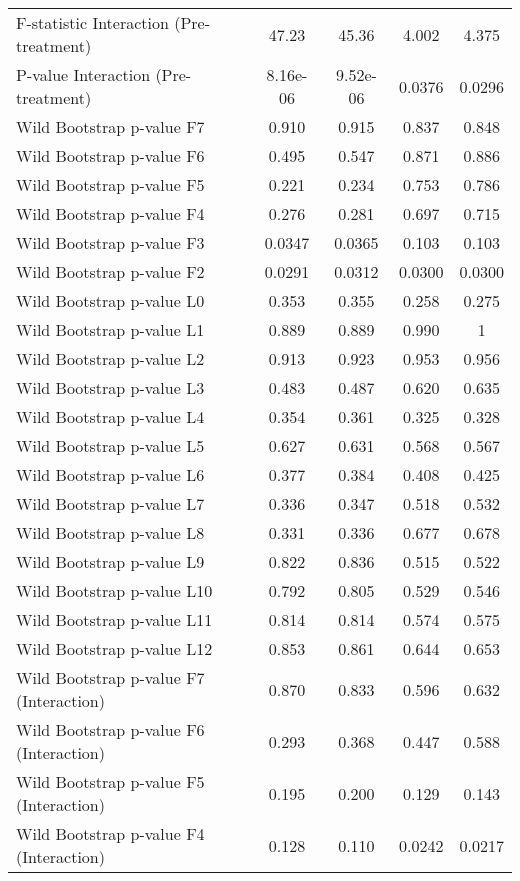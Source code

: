 \documentclass[]{article}
\begin{document}
\begin{tabular}{lcccc}
F-statistic Interaction (Pre-treatment) & 47.23 & 45.36 & 4.002 & 4.375 \\
P-value Interaction (Pre-treatment) & 8.16e-06 & 9.52e-06 & 0.0376 & 0.0296 \\
Wild Bootstrap p-value F7 & 0.910 & 0.915 & 0.837 & 0.848 \\
Wild Bootstrap p-value F6 & 0.495 & 0.547 & 0.871 & 0.886 \\
Wild Bootstrap p-value F5 & 0.221 & 0.234 & 0.753 & 0.786 \\
Wild Bootstrap p-value F4 & 0.276 & 0.281 & 0.697 & 0.715 \\
Wild Bootstrap p-value F3 & 0.0347 & 0.0365 & 0.103 & 0.103 \\
Wild Bootstrap p-value F2 & 0.0291 & 0.0312 & 0.0300 & 0.0300 \\
Wild Bootstrap p-value L0 & 0.353 & 0.355 & 0.258 & 0.275 \\
Wild Bootstrap p-value L1 & 0.889 & 0.889 & 0.990 & 1 \\
Wild Bootstrap p-value L2 & 0.913 & 0.923 & 0.953 & 0.956 \\
Wild Bootstrap p-value L3 & 0.483 & 0.487 & 0.620 & 0.635 \\
Wild Bootstrap p-value L4 & 0.354 & 0.361 & 0.325 & 0.328 \\
Wild Bootstrap p-value L5 & 0.627 & 0.631 & 0.568 & 0.567 \\
Wild Bootstrap p-value L6 & 0.377 & 0.384 & 0.408 & 0.425 \\
Wild Bootstrap p-value L7 & 0.336 & 0.347 & 0.518 & 0.532 \\
Wild Bootstrap p-value L8 & 0.331 & 0.336 & 0.677 & 0.678 \\
Wild Bootstrap p-value L9 & 0.822 & 0.836 & 0.515 & 0.522 \\
Wild Bootstrap p-value L10 & 0.792 & 0.805 & 0.529 & 0.546 \\
Wild Bootstrap p-value L11 & 0.814 & 0.814 & 0.574 & 0.575 \\
Wild Bootstrap p-value L12 & 0.853 & 0.861 & 0.644 & 0.653 \\
Wild Bootstrap p-value F7 (Interaction) & 0.870 & 0.833 & 0.596 & 0.632 \\
Wild Bootstrap p-value F6 (Interaction) & 0.293 & 0.368 & 0.447 & 0.588 \\
Wild Bootstrap p-value F5 (Interaction) & 0.195 & 0.200 & 0.129 & 0.143 \\
Wild Bootstrap p-value F4 (Interaction) & 0.128 & 0.110 & 0.0242 & 0.0217 \\

\end{tabular}
\end{document}
